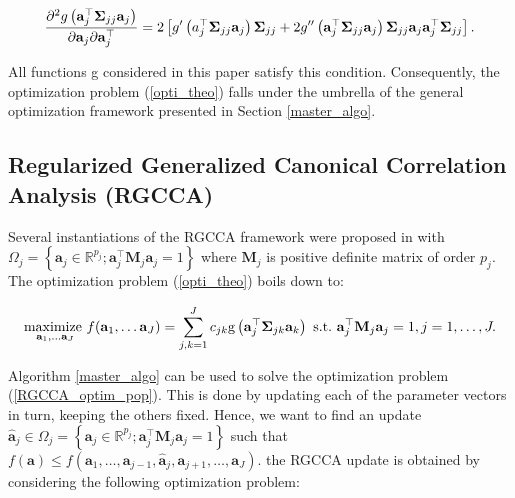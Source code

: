 \documentclass[
]{jss}
\begin{document}
\begin{equation}
\frac{\partial^2 g\left(\mathbf a_j^\top \mathbf{\Sigma}_{jj} \mathbf a_j \right)}{\partial \mathbf a_j \partial \mathbf a_j^\top} = 2 \left[ g'\left(\mathbf{\mathbf} a_j^\top \mathbf{\Sigma}_{jj} \mathbf a_j \right)\mathbf{\Sigma}_{jj} + 2 g''\left(\mathbf a_j^\top \mathbf{\Sigma}_{jj} \mathbf a_j\right) \mathbf{\Sigma}_{jj}\mathbf a_j\mathbf a_j^\top\mathbf{\Sigma}_{jj} \right]. 
\end{equation}

All functions g considered in this paper satisfy this condition.
Consequently, the optimization problem (\ref{opti_theo}) falls under the
umbrella of the general optimization framework presented in Section
\ref{master_algo}.

\hypertarget{regularized-generalized-canonical-correlation-analysis-rgcca}{%
\subsection{Regularized Generalized Canonical Correlation Analysis
(RGCCA)}\label{regularized-generalized-canonical-correlation-analysis-rgcca}}

Several instantiations of the RGCCA framework were proposed in \citep[
\citet{Tenenhaus2015}, \citet{Tenenhaus2017}]{Tenenhaus2011} with
\(\Omega_j=\left\lbrace \mathbf a_j \in \mathbb{R}^{p_j}; \mathbf{a}_j^\top \mathbf M_j \mathbf{a}_j = 1 \right\rbrace\)
where \(\mathbf{M}_j\) is positive definite matrix of order \(p_j\). The
optimization problem (\ref{opti_theo}) boils down to:

\begin{equation}
\underset{\mathbf{a}_1, \ldots \mathbf{a}_J}{\text{maximize~}} f(\mathbf{a}_1, \ldots \mathbf{a}_J) = \sum_{j,k=1}^J c_{jk} \text{g}\left(\mathbf{a}_j^\top \mathbf{\Sigma}_{jk} \mathbf{a}_k \right) \text{~s.t.~} \mathbf{a}_j^\top \mathbf{M}_j \mathbf{a}_j = 1,  j=1, \ldots, J.
\label{RGCCA_optim_pop}
\end{equation}

Algorithm \ref{master_algo} can be used to solve the optimization
problem (\ref{RGCCA_optim_pop}). This is done by updating each of the
parameter vectors in turn, keeping the others fixed. Hence, we want to
find an update
\(\hat{\mathbf{a}}_j\in \Omega_j=\left\lbrace \mathbf a_j \in \mathbb{R}^{p_j}; \mathbf{a}_j^\top \mathbf M_j \mathbf{a}_j = 1 \right\rbrace\)
such that
\(f(\mathbf{a})\leq f(\mathbf{a}_1, \ldots, \mathbf{a}_{j-1}, \hat{\mathbf{a}}_j, \mathbf{a}_{j+1}, \ldots, \mathbf{a}_J)\).
the RGCCA update is obtained by considering the following optimization
problem:
\end{document}
